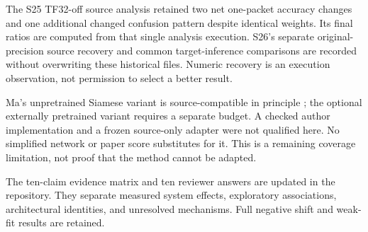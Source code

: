 \documentclass[journal]{IEEEtran}
\begin{document}
The S25 TF32-off source analysis retained two net one-packet accuracy changes and one additional changed confusion pattern despite identical weights. Its final ratios are computed from that single analysis execution. S26's separate original-precision source recovery and common target-inference comparisons are recorded without overwriting these historical files. Numeric recovery is an execution observation, not permission to select a better result.

Ma's unpretrained Siamese variant is source-compatible in principle \cite{ma2025robust}; the optional externally pretrained variant requires a separate budget. A checked author implementation and a frozen source-only adapter were not qualified here. No simplified network or paper score substitutes for it. This is a remaining coverage limitation, not proof that the method cannot be adapted.

The ten-claim evidence matrix and ten reviewer answers are updated in the repository. They separate measured system effects, exploratory associations, architectural identities, and unresolved mechanisms. Full negative shift and weak-fit results are retained.
\clearpage


\end{document}
